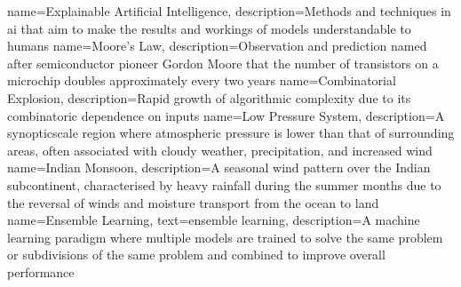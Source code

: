 {
    name=Explainable Artificial Intelligence,
    description={Methods and techniques in \acrfull{ai} that aim to make the results and workings of models understandable to humans}
}
{
    name=Moore's Law,
    description={Observation and prediction named after semiconductor pioneer Gordon Moore that the number of transistors on a microchip doubles approximately every two years}
}
{
    name=Combinatorial Explosion,
    description={Rapid growth of algorithmic complexity due to its combinatoric dependence on inputs}
}
{
    name=Low Pressure System,
    description={A \gls{synopticscale} region where atmospheric pressure is lower than that of surrounding areas, often associated with cloudy weather, precipitation, and increased wind}
}
{
    name=Indian Monsoon,
    description={A seasonal wind pattern over the Indian subcontinent, characterised by heavy rainfall during the summer months due to the reversal of winds and moisture transport from the ocean to land}
}
{
    name=Ensemble Learning,
    text={ensemble learning},
    description={A machine learning paradigm where multiple models are trained to solve the same problem or subdivisions of the same problem and combined to improve overall performance}
}

